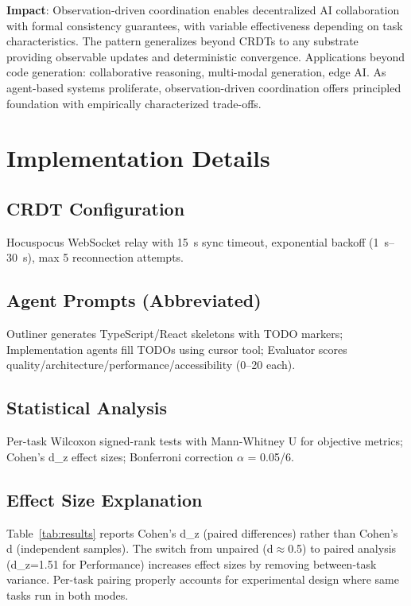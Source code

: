 \documentclass{article}
\begin{document}
\textbf{Impact}: Observation-driven coordination enables decentralized AI collaboration with formal consistency guarantees, with variable effectiveness depending on task characteristics. The pattern generalizes beyond CRDTs to any substrate providing observable updates and deterministic convergence. Applications beyond code generation: collaborative reasoning, multi-modal generation, edge AI. As agent-based systems proliferate, observation-driven coordination offers principled foundation with empirically characterized trade-offs.

\clearpage




\appendix

\section{Implementation Details}
\label{app:implementation}

\subsection{CRDT Configuration}

Hocuspocus WebSocket relay with 15~s sync timeout, exponential backoff (1~s--30~s), max 5 reconnection attempts.

\subsection{Agent Prompts (Abbreviated)}

Outliner generates TypeScript/React skeletons with TODO markers; Implementation agents fill TODOs using cursor tool; Evaluator scores quality/architecture/performance/accessibility (0--20 each).

\subsection{Statistical Analysis}

Per-task Wilcoxon signed-rank tests with Mann-Whitney U for objective metrics; Cohen's d\_z effect sizes; Bonferroni correction $\alpha$ = 0.05/6.

\subsection{Effect Size Explanation}

Table~\ref{tab:results} reports Cohen's d\_z (paired differences) rather than Cohen's d (independent samples). The switch from unpaired (d$\approx$0.5) to paired analysis (d\_z=1.51 for Performance) increases effect sizes by removing between-task variance. Per-task pairing properly accounts for experimental design where same tasks run in both modes.
\end{document}
